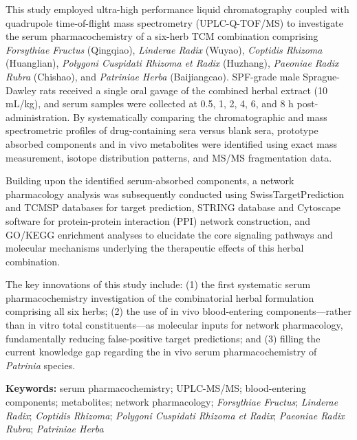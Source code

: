 \documentclass[12pt,a4paper,UTF8,openany]{ctexbook}
\begin{document}
This study employed ultra-high performance liquid chromatography coupled with quadrupole time-of-flight mass spectrometry (UPLC-Q-TOF/MS) to investigate the serum pharmacochemistry of a six-herb TCM combination comprising \textit{Forsythiae Fructus} (Qingqiao), \textit{Linderae Radix} (Wuyao), \textit{Coptidis Rhizoma} (Huanglian), \textit{Polygoni Cuspidati Rhizoma et Radix} (Huzhang), \textit{Paeoniae Radix Rubra} (Chishao), and \textit{Patriniae Herba} (Baijiangcao). SPF-grade male Sprague-Dawley rats received a single oral gavage of the combined herbal extract (10 mL/kg), and serum samples were collected at 0.5, 1, 2, 4, 6, and 8 h post-administration. By systematically comparing the chromatographic and mass spectrometric profiles of drug-containing sera versus blank sera, prototype absorbed components and in vivo metabolites were identified using exact mass measurement, isotope distribution patterns, and MS/MS fragmentation data.

Building upon the identified serum-absorbed components, a network pharmacology analysis was subsequently conducted using SwissTargetPrediction and TCMSP databases for target prediction, STRING database and Cytoscape software for protein-protein interaction (PPI) network construction, and GO/KEGG enrichment analyses to elucidate the core signaling pathways and molecular mechanisms underlying the therapeutic effects of this herbal combination.

The key innovations of this study include: (1) the first systematic serum pharmacochemistry investigation of the combinatorial herbal formulation comprising all six herbs; (2) the use of in vivo blood-entering components—rather than in vitro total constituents—as molecular inputs for network pharmacology, fundamentally reducing false-positive target predictions; and (3) filling the current knowledge gap regarding the in vivo serum pharmacochemistry of \textit{Patrinia} species.

\vspace{1em}
\noindent\textbf{Keywords:} serum pharmacochemistry; UPLC-MS/MS; blood-entering components; metabolites; network pharmacology; \textit{Forsythiae Fructus}; \textit{Linderae Radix}; \textit{Coptidis Rhizoma}; \textit{Polygoni Cuspidati Rhizoma et Radix}; \textit{Paeoniae Radix Rubra}; \textit{Patriniae Herba}

\tableofcontents

\listoffigures
{}
\end{document}
